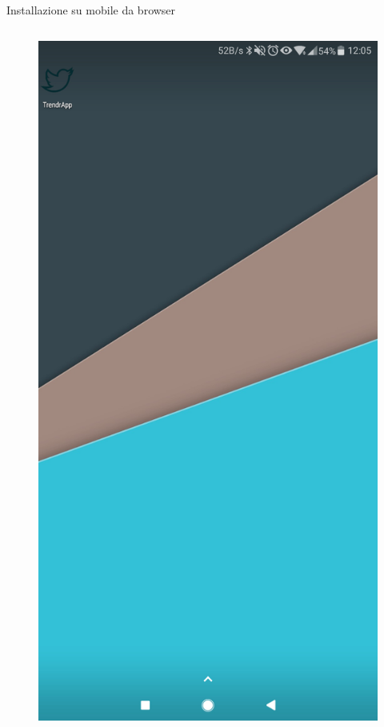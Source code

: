 \documentclass[xcolor=svgnames, aspectratio=169]{beamer}
\begin{document}
\begin{frame}{Installazione su mobile da browser}
\begin{columns}[t]
        \vspace*{-8pt}
        \begin{figure}[H]
            \centering
            \includegraphics[width=0.32\paperwidth,height=0.7\paperheight,keepaspectratio]{Immagini/Mobile_Icona_App_Installata.jpg}
        \end{figure}
    \end{columns}
\end{frame}
\end{document}
